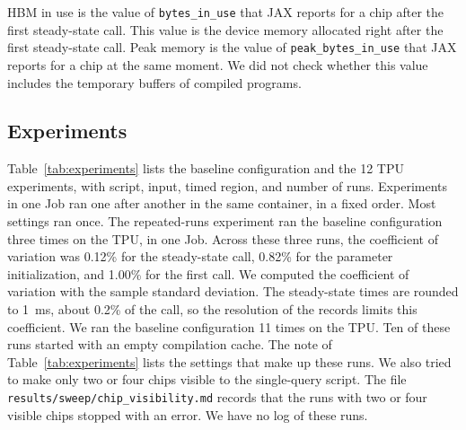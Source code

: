 HBM in use is the value of \texttt{bytes\_in\_use} that JAX reports for a chip after the first steady-state call. This
value is the device memory allocated right after the first steady-state call. Peak memory is the value of
\texttt{peak\_bytes\_in\_use} that JAX reports for a chip at the same moment. We did not check whether this value
includes the temporary buffers of compiled programs.

\subsection{Experiments}\label{sec:experiments}
Table~\ref{tab:experiments} lists the baseline configuration and the 12 TPU experiments, with script, input, timed region, and number of runs. %
Experiments in one Job ran one after another in the same container, in a fixed order. Most settings ran once. The
repeated-runs experiment ran the baseline configuration three times on the TPU, in one Job.
Across these three runs, the coefficient of variation was 0.12\% for the steady-state call, 0.82\% for the parameter initialization, and 1.00\% for the first call. %
We computed the coefficient of variation with the sample standard deviation.
The steady-state times are rounded to 1~ms, about 0.2\% of the call, so the resolution of the records limits this coefficient. %
We ran the baseline configuration 11 times on the TPU. Ten of these runs started with an empty compilation cache. %
The note of Table~\ref{tab:experiments} lists the settings that make up these runs. We also tried to make only two or
four chips visible to the single-query script. The file \texttt{results/sweep/chip\_visibility.md} records that the
runs with two or four visible chips stopped with an error. We have no log of these runs.

